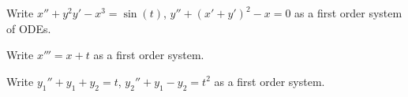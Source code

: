 \documentclass{ximera}
\begin{document}
\begin{exercise}
    Write $x'' + y^2 y' - x^3 = \sin(t)$, $y'' + {(x'+y')}^2 -x = 0$ as a first order system of ODEs.\\
\end{exercise}

\begin{exercise}%
    Write $x''' = x + t$ as a first order system.
\end{exercise}

\begin{exercise}%
    Write $y_1'' + y_1 + y_2 = t$, $y_2'' + y_1 - y_2 = t^2$ as a first order system.
\end{exercise}
\end{document}
